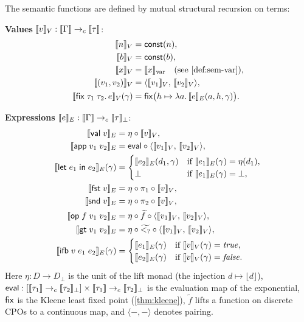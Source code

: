 \begin{definition}
\label{def:sem-val-exp}
The semantic functions are defined by mutual structural recursion on
terms:

\medskip\noindent
\textbf{Values} $\llbracket v \rrbracket_V : \llbracket \Gamma \rrbracket \to_c \llbracket \tau \rrbracket$:
\begin{align*}
  \sem{n}_V &= \mathsf{const}(n), \\
  \sem{b}_V &= \mathsf{const}(b), \\
  \sem{x}_V &= \sem{x}_{\text{var}} \quad\text{(see \cref{def:sem-var})}, \\
  \sem{(v_1, v_2)}_V &= \langle \sem{v_1}_V,\, \sem{v_2}_V \rangle, \\
  \sem{\mathsf{fix}\;\tau_1\;\tau_2.\, e}_V(\gamma)
    &= \fixp\bigl(h \mapsto \lambda a.\,
       \sem{e}_E(a, h, \gamma)\bigr).
\end{align*}

\noindent
\textbf{Expressions} $\llbracket e \rrbracket_E : \llbracket \Gamma \rrbracket \to_c \llbracket \tau \rrbracket_\bot$:
\begin{align*}
  \llbracket \mathsf{val}\;v \rrbracket_E &= \eta \circ \llbracket v \rrbracket_V, \\
  \llbracket \mathsf{app}\;v_1\;v_2 \rrbracket_E &= \mathsf{eval} \circ
    \langle \llbracket v_1 \rrbracket_V,\, \llbracket v_2 \rrbracket_V \rangle, \\
  \llbracket \mathsf{let}\;e_1\;\mathsf{in}\;e_2 \rrbracket_E(\gamma)
    &= \begin{cases}
         \llbracket e_2 \rrbracket_E(d_1, \gamma)
           & \text{if } \llbracket e_1 \rrbracket_E(\gamma) = \eta(d_1), \\
         \bot & \text{if } \llbracket e_1 \rrbracket_E(\gamma) = \bot,
       \end{cases} \\
  \llbracket \mathsf{fst}\;v \rrbracket_E &= \eta \circ \pi_1 \circ \llbracket v \rrbracket_V, \\
  \llbracket \mathsf{snd}\;v \rrbracket_E &= \eta \circ \pi_2 \circ \llbracket v \rrbracket_V, \\
  \llbracket \mathsf{op}\;f\;v_1\;v_2 \rrbracket_E
    &= \eta \circ \widetilde{f} \circ
       \langle \llbracket v_1 \rrbracket_V,\, \llbracket v_2 \rrbracket_V \rangle, \\
  \llbracket \mathsf{gt}\;v_1\;v_2 \rrbracket_E
    &= \eta \circ \widetilde{<_?} \circ
       \langle \llbracket v_1 \rrbracket_V,\, \llbracket v_2 \rrbracket_V \rangle, \\
  \llbracket \mathsf{ifb}\;v\;e_1\;e_2 \rrbracket_E(\gamma)
    &= \begin{cases}
         \llbracket e_1 \rrbracket_E(\gamma) & \text{if } \llbracket v \rrbracket_V(\gamma) = \mathit{true}, \\
         \llbracket e_2 \rrbracket_E(\gamma) & \text{if } \llbracket v \rrbracket_V(\gamma) = \mathit{false}.
       \end{cases}
\end{align*}
Here $\eta : D \to D_\bot$ is the unit of the lift monad (the
injection $d \mapsto \lfloor d \rfloor$), $\mathsf{eval} :
[\llbracket \tau_1 \rrbracket \to_c \llbracket \tau_2 \rrbracket_\bot] \times \llbracket \tau_1 \rrbracket \to_c
\llbracket \tau_2 \rrbracket_\bot$ is the evaluation map of the exponential, $\mathsf{fix}$
is the Kleene least fixed point (\cref{thm:kleene}),
$\widetilde{f}$ lifts a function on discrete CPOs to a continuous map,
and $\langle -, - \rangle$ denotes pairing.
\end{definition}


